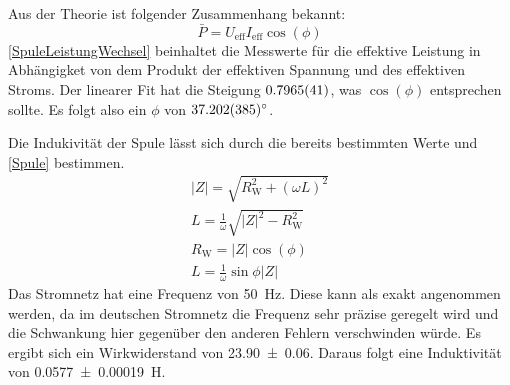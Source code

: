 \documentclass[
	a4paper,
	12pt,
	pagesize,
	ngerman
]{scrartcl}
\begin{document}
	Aus der Theorie ist folgender Zusammenhang bekannt:
	\begin{equation}
		\bar{P} = U_\text{eff} I_\text{eff} \cos(\phi)
	\end{equation}
	\cref{SpuleLeistungWechsel} beinhaltet die Messwerte für die effektive Leistung in Abhängigket von dem Produkt der effektiven Spannung und des effektiven Stroms. 
	Der linearer Fit hat die Steigung $\SI{0,7965\pm 0,0041}{}$, was $\cos(\phi)$ entsprechen sollte. 
	Es folgt also ein $\phi$ von $\ang{37,202\pm 0,385}$.

	Die Indukivität der Spule lässt sich durch die bereits bestimmten Werte und \cref{Spule} bestimmen.
	\begin{gather}
		\label{Spule}
		|Z| = \sqrt{R_\text{W}^2 + (\omega L)^2} \\
		L = \frac{1}{\omega}\sqrt{|Z|^2-R_\text{W}^2} \\
		R_\text{W} = |Z| \cos(\phi)  \\
		L = \frac{1}{\omega} \sin{\phi} |Z|
	\end{gather}
		Das Stromnetz hat eine Frequenz von \SI{50}{Hz}. 
		Diese kann als exakt angenommen werden, da im deutschen Stromnetz die Frequenz sehr präzise geregelt wird und die Schwankung hier gegenüber den anderen Fehlern verschwinden würde.
		Es ergibt sich ein Wirkwiderstand von \SI{23,90 \pm 0,06}{\Omega}.
		Daraus folgt eine Induktivität von \SI{0,0577 \pm 0,00019}{H}. 
	
\end{document}
